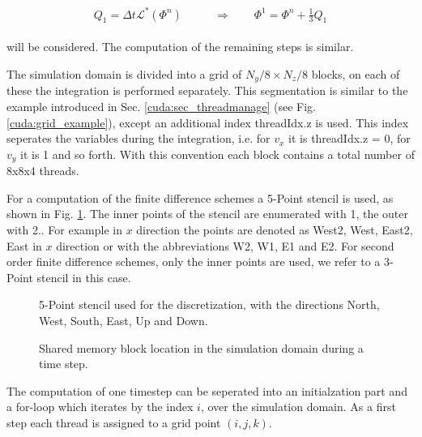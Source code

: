 \begin{align}
    \begin{split}
    Q_1 = \Delta t \mathcal{L}^*\left(\Phi^n\right)\qquad &\Rightarrow \qquad \Phi^{1} = \Phi^n + \frac{1}{3}Q_1
    \end{split}
\end{align}

will be considered.  The computation of the remaining steps is similar.


The simulation domain is divided into a grid of  $N_y/8 \times N_z/8$ blocks, on each of these the integration is performed separately.
This segmentation is similar to the example introduced in Sec. \ref{cuda:sec_threadmanage} (see Fig. \ref{cuda:grid_example}), except an
additional index threadIdx.z is used.
This index seperates the variables during the integration, i.e. for $v_x$ it is threadIdx.z = 0, for $v_y$  it is 1 and so forth.
With this convention each block contains a total number of 8x8x4 threads.

For a computation of the finite difference schemes  a 5-Point stencil is used, as shown in Fig. \ref{cuda:stencil}.
The inner points of the stencil are enumerated with 1, the outer with 2.. For example in $x$ direction the points are denoted as West2,
West, East2, East in $x$ direction or with the abbreviations W2, W1, E1 and E2.
For second order finite difference schemes, only the inner points  are used, we refer to a 3-Point stencil in this case.

\begin{figure}[!bp]
      \centering
        \caption{
            5-Point stencil used for the discretization, with the directions North, West, South, East, Up and Down.
        }
       \label{cuda:stencil}
\end{figure}

\begin{figure}[!bp]
      \centering
       \caption{
           Shared memory block location in the simulation domain during a time step.
       }
       \label{cuda:timestep_algo_img}
\end{figure}
\clearpage

The computation of one timestep can be seperated into an initialzation part and a for-loop which iterates by the index $i$, over the simulation domain.
As a first step each thread is assigned to a grid point $(i, j, k)$.

